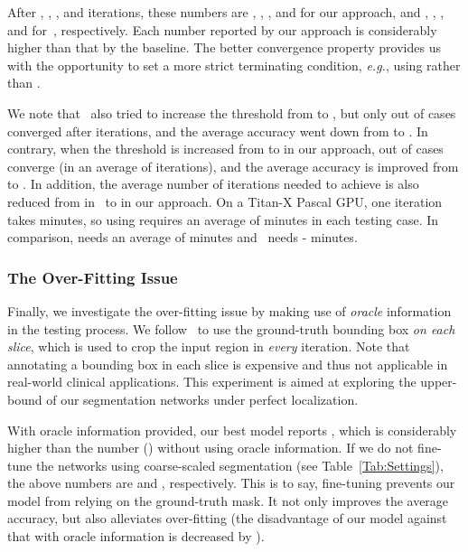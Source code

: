 \documentclass[10pt,twocolumn,letterpaper]{article}
\begin{document}
After , , ,  and  iterations, these numbers are , , ,  and  for our approach,
and , , ,  and  for~\cite{Zhou_2017_Fixed}, respectively.
Each number reported by our approach is considerably higher than that by the baseline.
The better convergence property provides us with the opportunity to set a more strict terminating condition,
{\em e.g.}, using  rather than .

We note that~\cite{Zhou_2017_Fixed} also tried to increase the threshold from  to ,
but only  out of  cases converged after  iterations, and the average accuracy went down from  to .
In contrary, when the threshold is increased from  to  in our approach,
 out of  cases converge (in an average of  iterations),
and the average accuracy is improved from  to .
In addition, the average number of iterations needed to achieve 
is also reduced from  in~\cite{Zhou_2017_Fixed} to  in our approach.
On a Titan-X Pascal GPU, one iteration takes  minutes,
so using  requires an average of  minutes in each testing case.
In comparison, \cite{Zhou_2017_Fixed} needs an average of  minutes and~\cite{Roth_2016_Spatial} needs - minutes.


\vspace{-0.2cm}
\subsubsection{The Over-Fitting Issue}
\label{ExperimentsNIH:Diagnosis:OverFitting}

Finally, we investigate the over-fitting issue by making use of {\em oracle} information in the testing process.
We follow~\cite{Zhou_2017_Fixed} to use the ground-truth bounding box {\em on each slice},
which is used to crop the input region in {\em every} iteration.
Note that annotating a bounding box in each slice is expensive and thus not applicable in real-world clinical applications.
This experiment is aimed at exploring the upper-bound of our segmentation networks under perfect localization.

With oracle information provided, our best model reports ,
which is considerably higher than the number () without using oracle information.
If we do not fine-tune the networks using coarse-scaled segmentation (see Table~\ref{Tab:Settings}),
the above numbers are  and , respectively.
This is to say, fine-tuning prevents our model from relying on the ground-truth mask.
It not only improves the average accuracy,
but also alleviates over-fitting (the disadvantage of our model against that with oracle information is decreased by ).
\end{document}
